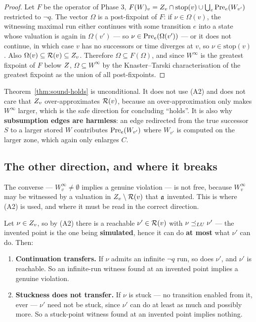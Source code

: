 \begin{proof}
Let $F$ be the operator of Phase 3, $F(W)_v = Z_v \cap \mathrm{stop}(v) \cup \bigcup_e
\mathrm{Pre}_e(W_{v'})$ restricted to $\lnot q$. The vector $\Omega$ is a post-fixpoint of $F$: if
$\nu \in \Omega(v)$, the witnessing maximal run either continues with some transition $e$ into a
state whose valuation is again in $\Omega(v')$ --- so $\nu \in \mathrm{Pre}_e(\Omega(v'))$ --- or it does
not continue, in which case $v$ has no successors or time diverges at $v$, so
$\nu \in \mathrm{stop}(v)$. Also $\Omega(v) \subseteq \mathcal{R}(v) \subseteq Z_v$. Therefore
$\Omega \subseteq F(\Omega)$, and since $W^\infty$ is the greatest fixpoint of $F$ below $Z$,
$\Omega \subseteq W^\infty$ by the Knaster--Tarski characterisation of the greatest fixpoint as the
union of all post-fixpoints.
\end{proof}

Theorem~\ref{thm:sound-holds} is unconditional. It does not use (A2) and does not care that
$Z_v$ over-approximates $\mathcal{R}(v)$, because an over-approximation only makes $W^\infty$ larger,
which is the safe direction for concluding ``holds''. It is also why \textbf{subsumption edges are
harmless}: an edge redirected from the true successor $S$ to a larger stored $W$ contributes
$\mathrm{Pre}_e(W_{v'})$ where $W_{v'}$ is computed on the larger zone, which again only enlarges $C$.

\subsection{The other direction, and where it breaks}
\label{sec:soundness:asym}

The converse --- $W_v^\infty \neq \emptyset$ implies a genuine violation --- is not free, because
$W_v^\infty$ may be witnessed by a valuation in $Z_v \setminus \mathcal{R}(v)$ that $\mathfrak{a}$ invented.
This is where (A2) is used, and where it must be read in the correct direction.

\begin{theorem}
\label{thm:asym}
Let $\nu \in Z_v$, so by (A2) there is a reachable $\nu' \in \mathcal{R}(v)$ with $\nu \preceq_{LU} \nu'$
--- the invented point is the one being \textbf{simulated}, hence it can do \textbf{at most} what
$\nu'$ can do. Then:
\begin{enumerate}
  \item[(i)] \textbf{Continuation transfers.} If $\nu$ admits an infinite $\lnot q$ run, so does
        $\nu'$, and $\nu'$ is reachable. So an infinite-run witness found at an invented point
        implies a genuine violation. \proved{}
  \item[(ii)] \textbf{Stuckness does not transfer.} If $\nu$ is stuck --- no transition enabled from
        it, ever --- $\nu'$ need not be stuck, since $\nu'$ can do at least as much and possibly
        more. So a stuck-point witness found at an invented point implies nothing. \proved{}
\end{enumerate}
\end{theorem}

